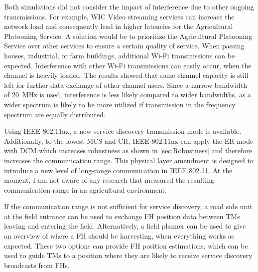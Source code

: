 Both simulations did not consider the impact of interference due to other ongoing transmissions.
For example, \ac{WIC} Video streaming services can increase the network load and consequently lead in higher latencies for
the Agricultural Platooning Service.
A solution would be to prioritize the Agricultural Platooning Service over other services
to ensure a certain quality of service.
When passing houses, industrial, or farm buildings, additional Wi-Fi transmissions can be expected.
Interference with other Wi-Fi
transmissions can easily occur, when the channel is heavily loaded.
The results showed that some channel capacity is still left for further data exchange of other channel users.
Since a narrow bandwidth of \SI{20}{\mega\hertz} is used, interference is less likely compared to wider bandwidths,
as a wider spectrum is likely to be more utilized if transmission in the frequency spectrum are equally distributed.


Using IEEE 802.11ax, a new service discovery transmission mode is available.
Additionally, to the lowest \ac{MCS} and \ac{CR},
IEEE 802.11ax can apply the \ac{ER} mode with \ac{DCM} which increases robustness as shown in \autoref{sec:Robustness}
and therefore increases the communication range.
This physical layer amendment is designed to introduce a new level of long-range communication in IEEE 802.11.
At the moment, I am not aware of any research that measured the resulting communication range in an agricultural environment.

If the communication range is not sufficient for service discovery, a road side unit at the field entrance can be used to exchange \ac{FH} position data
between \acp{TM} leaving and entering the field.
Alternatively, a field planner can be used to give an overview of where a \ac{FH} should be harvesting,
when everything works as expected.
These two options can provide \ac{FH} position estimations, which can be used to guide \acp{TM} to a position where they are likely
to receive service discovery broadcasts from \acp{FH}.







